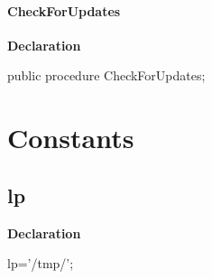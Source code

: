 \documentclass{report}
\newif\ifpdf
\begin{document}
\paragraph*{CheckForUpdates}\hspace*{\fill}

\label{mnupdate.TUMnForm-CheckForUpdates}
\begin{list}{}{
\setlength{\itemindent}{0cm}
\setlength{\listparindent}{0cm}
\setlength{\leftmargin}{\evensidemargin}
\addtolength{\leftmargin}{\tmplength}
\settowidth{\labelsep}{X}
\addtolength{\leftmargin}{\labelsep}
\setlength{\labelwidth}{\tmplength}
}
\item[\textbf{Declaration}\hfill]
\ifpdf
\begin{flushleft}
\fi
\begin{ttfamily}
public procedure CheckForUpdates;\end{ttfamily}

\ifpdf
\end{flushleft}
\fi

\end{list}
\section{Constants}
\ifpdf
\subsection*{\large{\textbf{lp}}\normalsize\hspace{1ex}\hrulefill}
\else
\subsection*{lp}
\fi
\label{mnupdate-lp}
\begin{list}{}{
\setlength{\itemindent}{0cm}
\setlength{\listparindent}{0cm}
\setlength{\leftmargin}{\evensidemargin}
\addtolength{\leftmargin}{\tmplength}
\settowidth{\labelsep}{X}
\addtolength{\leftmargin}{\labelsep}
\setlength{\labelwidth}{\tmplength}
}
\item[\textbf{Declaration}\hfill]
\ifpdf
\begin{flushleft}
\fi
\begin{ttfamily}
lp='/tmp/';\end{ttfamily}

\ifpdf
\end{flushleft}
\fi

\end{list}
\end{document}
